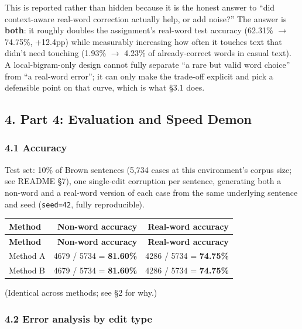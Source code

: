 \documentclass[11pt,a4paper]{article}
\begin{document}
This is reported rather than hidden because it is the honest answer to ``did context-aware real-word correction actually help, or add noise?'' The answer is \textbf{both}: it roughly doubles the assignment's real-word test accuracy (62.31\% $\rightarrow$ 74.75\%, +12.4pp) while measurably increasing how often it touches text that didn't need touching (1.93\% $\rightarrow$ 4.23\% of already-correct words in casual text). A local-bigram-only design cannot fully separate ``a rare but valid word choice'' from ``a real-word error''; it can only make the trade-off explicit and pick a defensible point on that curve, which is what \S{}3.1 does.

\subsection*{4. Part 4: Evaluation and Speed Demon}

\subsubsection*{4.1 Accuracy}

Test set: 10\% of Brown sentences (5,734 cases at this environment's corpus size; see README \S{}7), one single-edit corruption per sentence, generating both a non-word and a real-word version of each case from the same underlying sentence and seed (\texttt{seed=42}, fully reproducible).

{\small
\setlength{\tabcolsep}{4pt}
\begin{longtable}{lrr}
\toprule
\textbf{Method} & \textbf{Non-word accuracy} & \textbf{Real-word accuracy} \\
\midrule
\endfirsthead
\toprule
\textbf{Method} & \textbf{Non-word accuracy} & \textbf{Real-word accuracy} \\
\midrule
\endhead
Method A & 4679 / 5734 = \textbf{81.60\%} & 4286 / 5734 = \textbf{74.75\%} \\
Method B & 4679 / 5734 = \textbf{81.60\%} & 4286 / 5734 = \textbf{74.75\%} \\
\bottomrule
\end{longtable}}

(Identical across methods; see \S{}2 for why.)

\subsubsection*{4.2 Error analysis by edit type}
\end{document}
